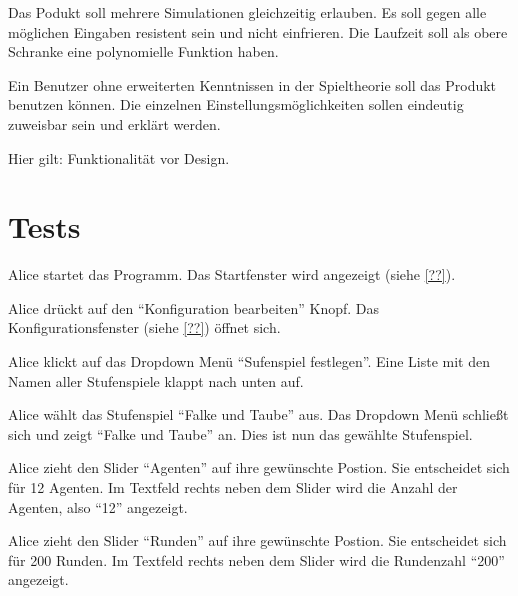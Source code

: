 \documentclass[parskip=full,11pt,twoside]{scrartcl}
\begin{document}

Das Podukt soll mehrere Simulationen gleichzeitig erlauben. Es soll gegen alle möglichen Eingaben resistent sein und nicht einfrieren.
Die Laufzeit soll als obere Schranke eine polynomielle Funktion haben.


Ein Benutzer ohne erweiterten Kenntnissen in der Spieltheorie soll das Produkt benutzen können.
Die einzelnen Einstellungsmöglichkeiten sollen eindeutig zuweisbar sein und erklärt werden. 

Hier gilt: Funktionalität vor Design. 

\section{Tests}


{Alice startet das Programm.}
{Das Startfenster wird angezeigt (siehe \cref{??}).}

{Alice drückt auf den \enquote{Konfiguration bearbeiten} Knopf.}%
{Das Konfigurationsfenster (siehe \cref{??}) öffnet sich.}

{Alice klickt auf das Dropdown Menü \enquote{Sufenspiel festlegen}.}%
{Eine Liste mit den Namen aller Stufenspiele klappt nach unten auf.}

\teststep{}
{Alice wählt das Stufenspiel \enquote{Falke und Taube} aus.}
{Das Dropdown Menü schließt sich und zeigt \enquote{Falke und Taube} an. Dies ist nun das gewählte Stufenspiel.}

{Alice zieht den Slider \enquote{Agenten} auf ihre gewünschte Postion. Sie entscheidet sich für 12 Agenten.}%
{Im Textfeld rechts neben dem Slider wird die Anzahl der Agenten, also \enquote{12} angezeigt.}

{Alice zieht den Slider \enquote{Runden} auf ihre gewünschte Postion. Sie entscheidet sich für 200 Runden.}%
{Im Textfeld rechts neben dem Slider wird die Rundenzahl \enquote{200} angezeigt.}
\end{document}

